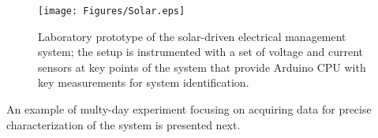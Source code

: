 \documentclass{ifacconf}
\begin{document}
\begin{figure}[thpb]
  \centering
  \texttt{[image: Figures/Solar.eps]}
  \caption{Laboratory prototype of the solar-driven electrical management system; the setup is instrumented with a set of voltage and current sensors at key points of the system that provide Arduino CPU with key measurements for system identification.}
  \label{fig:Solar_arch}
\end{figure}

An example of multy-day experiment focusing on acquiring data for precise characterization of the system is presented next.

%
%
%
\end{document}
